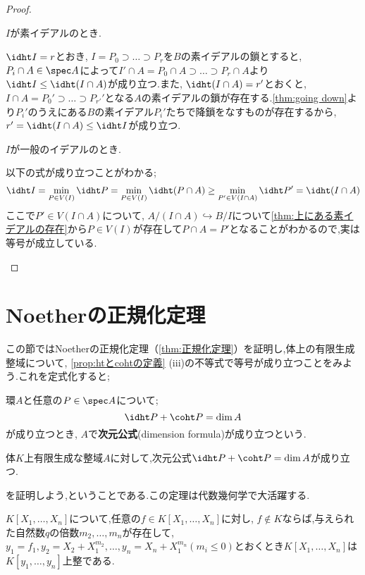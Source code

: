 \begin{proof}
	\begin{step}
		\item $I$が素イデアルのとき.
		
		$\idht I=r$とおき, $I=P_0\supset\dots\supset P_r$を$B$の素イデアルの鎖とすると, $P_i\cap A\in\spec A$によって$I'\cap A=P_0\cap A\supset\dots\supset P_r\cap A$より$\idht I\leq \idht (I\cap A)$が成り立つ.また, $\idht (I\cap A)=r'$とおくと, $I\cap A=P_0'\supset\dots\supset P_{r'}'$となる$A$の素イデアルの鎖が存在する.\ref{thm:going down}より$P_i'$のうえにある$B$の素イデアル$P_i'$たちで降鎖をなすものが存在するから, $r'=\idht(I\cap A)\leq\idht I$が成り立つ.
		
		\item $I$が一般のイデアルのとき.
		
		以下の式が成り立つことがわかる;
		\[\idht I=\min_{P\in V(I)}\idht P=\min_{P\in V(I)}\idht (P\cap A)\geq\min_{P'\in V(I\cap A)}\idht P'=\idht (I\cap A)\]
		ここで$P'\in V(I\cap A)$について, $A/(I\cap A)\hookrightarrow B/I$について\ref{thm:上にある素イデアルの存在}から$P\in V(I)$が存在して$P\cap A=P'$となることがわかるので,実は等号が成立している.
	\end{step}
\end{proof}

\section{Noetherの正規化定理}
この節ではNoetherの正規化定理（\ref{thm:正規化定理}）を証明し,体上の有限生成整域について, \ref{prop:htとcohtの定義} (iii)の不等式で等号が成り立つことをみよう.これを定式化すると;

\begin{defi}[次元公式]
	環$A$と任意の$P\in\spec A$について;
	\[\idht P+\coht P=\dim A\]
	が成り立つとき, $A$で\textbf{次元公式}(dimension formula)が成り立つという.
\end{defi}

\begin{thm}\label{thm:次元公式}
	体$K$上有限生成な整域$A$に対して,次元公式$\idht P +\coht P =\dim A$が成り立つ.
\end{thm}

を証明しよう,ということである.この定理は代数幾何学で大活躍する.

\begin{lem}\label{lem:正規化の補題1}
	$K[X_1,\dots,X_n]$について,任意の$f\in K[X_1,\dots,X_n]$に対し, $f\not\in K$ならば,与えられた自然数$q$の倍数$m_2,\dots,m_n$が存在して, $y_1=f_1,y_2=X_2+X_1^{m_2},\dots,y_n=X_n+X_1^{m_n} (m_i\leq0)$とおくとき$K[X_1,\dots,X_n]$は$K[y_1,\dots,y_n]$上整である.
\end{lem}

